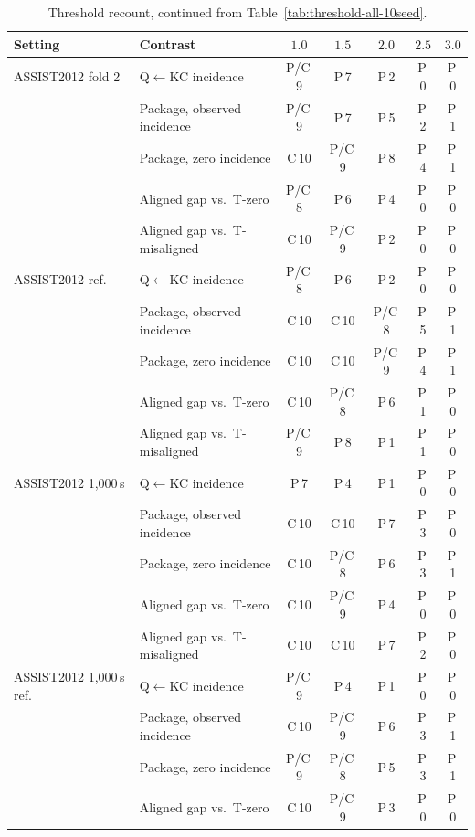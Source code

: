 \begin{table}[tbp]
\caption{Threshold recount, continued from Table~\ref{tab:threshold-all-10seed}.}
\label{tab:threshold-all-10seed-b}
\centering
\scriptsize
\setlength{\tabcolsep}{1.5pt}
\renewcommand{\arraystretch}{0.84}
\begin{tabular}{@{}llccccc@{}}
\toprule
Setting & Contrast & $1.0$ & $1.5$ & $2.0$ & $2.5$ & $3.0$ \\
\midrule
ASSIST2012 fold 2 & Q$\leftarrow$KC incidence & P/C\,9 & P\,7 & P\,2 & P\,0 & P\,0 \\
 & Package, observed incidence & P/C\,9 & P\,7 & P\,5 & P\,2 & P\,1 \\
 & Package, zero incidence & C\,10 & P/C\,9 & P\,8 & P\,4 & P\,1 \\
 & Aligned gap vs.\ T-zero & P/C\,8 & P\,6 & P\,4 & P\,0 & P\,0 \\
 & Aligned gap vs.\ T-misaligned & C\,10 & P/C\,9 & P\,2 & P\,0 & P\,0 \\
\addlinespace
ASSIST2012 ref. & Q$\leftarrow$KC incidence & P/C\,8 & P\,6 & P\,2 & P\,0 & P\,0 \\
 & Package, observed incidence & C\,10 & C\,10 & P/C\,8 & P\,5 & P\,1 \\
 & Package, zero incidence & C\,10 & C\,10 & P/C\,9 & P\,4 & P\,1 \\
 & Aligned gap vs.\ T-zero & C\,10 & P/C\,8 & P\,6 & P\,1 & P\,0 \\
 & Aligned gap vs.\ T-misaligned & P/C\,9 & P\,8 & P\,1 & P\,1 & P\,0 \\
\addlinespace
ASSIST2012 1{,}000\,s & Q$\leftarrow$KC incidence & P\,7 & P\,4 & P\,1 & P\,0 & P\,0 \\
 & Package, observed incidence & C\,10 & C\,10 & P\,7 & P\,3 & P\,0 \\
 & Package, zero incidence & C\,10 & P/C\,8 & P\,6 & P\,3 & P\,1 \\
 & Aligned gap vs.\ T-zero & C\,10 & P/C\,9 & P\,4 & P\,0 & P\,0 \\
 & Aligned gap vs.\ T-misaligned & C\,10 & C\,10 & P\,7 & P\,2 & P\,0 \\
\addlinespace
ASSIST2012 1{,}000\,s ref. & Q$\leftarrow$KC incidence & P/C\,9 & P\,4 & P\,1 & P\,0 & P\,0 \\
 & Package, observed incidence & C\,10 & P/C\,9 & P\,6 & P\,3 & P\,1 \\
 & Package, zero incidence & P/C\,9 & P/C\,8 & P\,5 & P\,3 & P\,1 \\
 & Aligned gap vs.\ T-zero & C\,10 & P/C\,9 & P\,3 & P\,0 & P\,0 \\

\end{tabular}
\end{table}
